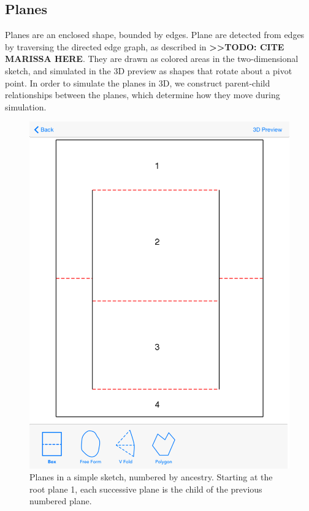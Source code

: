 \subsection{Planes}\label{planes}

Planes are an enclosed shape, bounded by edges. Plane are detected from
edges by traversing the directed edge graph, as described in
\textbf{\textgreater{}\textgreater{}TODO: CITE MARISSA HERE}. They are
drawn as colored areas in the two-dimensional sketch, and simulated in
the 3D preview as shapes that rotate about a pivot point. In order to
simulate the planes in 3D, we construct parent-child relationships
between the planes, which determine how they move during simulation.

\begin{figure}[htbp]
\centering
\includegraphics{figures/33_UI_Interface_Data_Structures/boxfold_planes.png}
\caption{Planes in a simple sketch, numbered by ancestry. Starting at
the root plane 1, each successive plane is the child of the previous
numbered plane.}
\end{figure}

